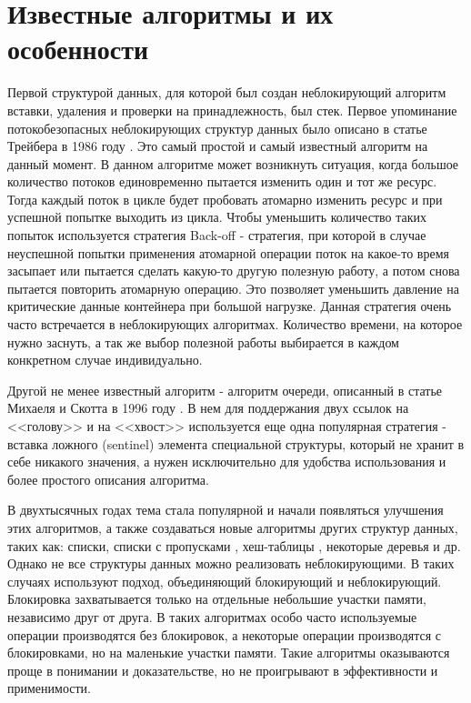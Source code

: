 \documentclass[12pt]{report}
\begin{document}
{		\section{Известные алгоритмы и их особенности}
		
		Первой структурой данных, для которой был создан неблокирующий алгоритм вставки, удаления и проверки на принадлежность, был стек. Первое упоминание потокобезопасных неблокирующих структур данных было описано в статье Трейбера в 1986 году \cite{Treiber}. Это самый простой и самый известный алгоритм на данный момент. В данном алгоритме может возникнуть ситуация, когда большое количество потоков единовременно пытается изменить один и тот же ресурс. Тогда каждый поток в цикле будет пробовать атомарно изменить ресурс и при успешной попытке выходить из цикла. Чтобы уменьшить количество таких попыток используется стратегия Back-off - стратегия, при которой в случае неуспешной попытки применения атомарной операции поток на какое-то время засыпает или пытается сделать какую-то другую полезную работу, а потом снова пытается повторить атомарную операцию. Это позволяет уменьшить давление на критические данные контейнера при большой нагрузке. Данная стратегия очень часто встречается в неблокирующих алгоритмах. Количество времени, на которое нужно заснуть, а так же выбор полезной работы выбирается в каждом конкретном случае индивидуально.
		
		Другой не менее известный алгоритм - алгоритм очереди, описанный в статье Михаеля и Скотта в 1996 году \cite{Queqe}. В нем для поддержания двух ссылок на <<голову>> и на <<хвост>> используется еще одна популярная стратегия - вставка ложного (sentinel) элемента специальной структуры, который не хранит в себе никакого значения, а нужен исключительно для удобства использования и более простого описания алгоритма.
		
		В двухтысячных годах тема стала популярной и начали появляться улучшения этих алгоритмов, а также создаваться новые алгоритмы других структур данных, таких как: списки\cite{LinkedList}, списки с пропусками \cite{ListSkipList},  хеш-таблицы \cite{HashTable}, некоторые деревья и др. Однако не все структуры данных можно реализовать неблокирующими. В таких случаях используют подход, объединяющий блокирующий и неблокирующий. Блокировка захватывается только на отдельные небольшие участки памяти, независимо друг от друга. В таких алгоритмах особо часто используемые операции производятся без блокировок, а некоторые операции производятся с блокировками, но на маленькие участки памяти. Такие алгоритмы оказываются проще в понимании и доказательстве, но не проигрывают в эффективности и применимости.  
		
}
\end{document}
